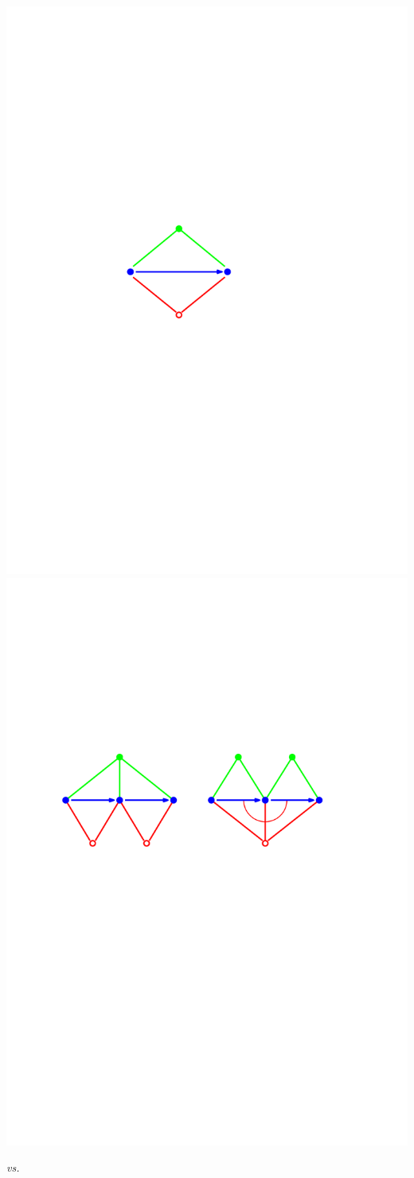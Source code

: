 \documentclass[portrait,final,a0paper,fontscale=0.25]{baposter}
\theoremstyle{definition}
\newcommand{\vs}{\textit{vs.}~} %
\begin{document}
\begin{poster}
{\vspace*{-.2cm}
\begin{center}
 \includegraphics[scale=.35]{TrianglesArrow}\hspace*{1cm}\includegraphics[scale=.35]{GlueTriangles}
\end{center}


\vs}
\end{poster}
\end{document}
